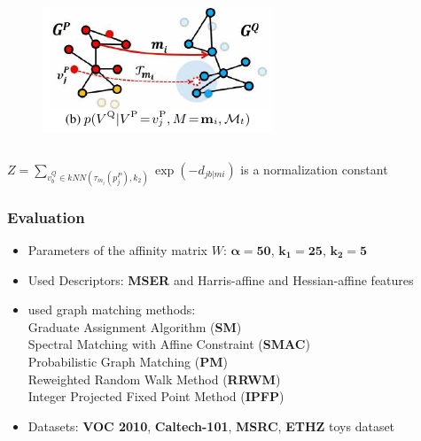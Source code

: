 \documentclass[hyperref={pdfpagelabels=false}]{beamer}
\begin{document}
\begin{frame}[allowframebreaks]
\begin{itemize}
\begin{columns}[T]
    \begin{column}{0.3\textwidth}
	\begin{figure}
	  \includegraphics[scale=0.5]{fig3b.png}
	\end{figure}
    \end{column}
  \end{columns}

\end{itemize}

$Z = \sum_{v_b^Q\in kNN(\tau_{m_i}(p_j^P),k_2)}\exp(-d_{jb|mi})$ is a normalization constant

\end{frame}




\begin{frame}
\frametitle{Evaluation}

\begin{itemize}
 \item Parameters of the affinity matrix $W$: $\mathbf{\alpha = 50}$, $\mathbf{k_1=25}$, $\mathbf{k_2=5}$
 \item Used Descriptors: {\bf MSER} \cite{MSER} and Harris-affine and Hessian-affine features \cite{HarrisAffine}
 \item used graph matching methods: \\
      Graduate Assignment Algorithm ({\bf SM}) \cite{SM} \\
      Spectral Matching with Affine Constraint ({\bf SMAC}) \cite{SMAC} \\
      Probabilistic Graph Matching ({\bf PM}) \cite{PM}\\
      Reweighted Random Walk Method ({\bf RRWM})\cite{MinsuChoRRW}\\
      Integer Projected Fixed Point Method ({\bf IPFP}) \cite{IPFP}
  \item Datasets: {\bf VOC 2010}, {\bf Caltech-101}, {\bf MSRC}, {\bf ETHZ} toys dataset   
   
\end{itemize}

\end{frame}
\end{document}

